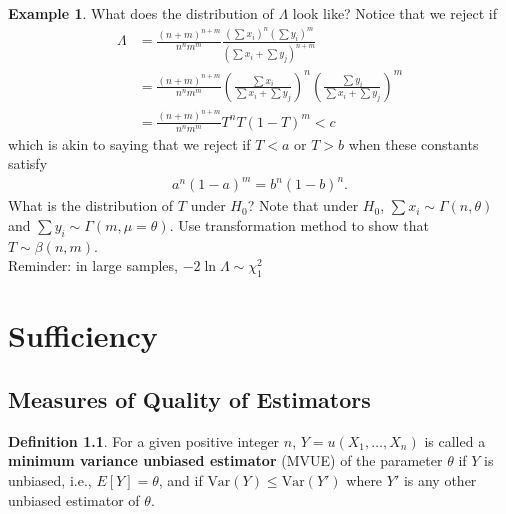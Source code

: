 \documentclass{book}
\theoremstyle{definition}
\newtheorem{defn}{Definition}[section]
\newtheorem{exmp}{Example}[section]
\newcommand{\Var}{\text{Var}}
\newcommand{\f}[2]{\frac{#1}{#2}}
\newcommand{\lp}{\left(}
\newcommand{\rp}{\right)}
\begin{document}
\begin{exmp}
	
	What does the distribution of $\Lambda$ look like? Notice that we reject if
	\begin{align}
	\Lambda &= \f{(n+m)^{n+m}}{n^n m^m} \f{\lp \sum x_i \rp^{n} \lp \sum y_i \rp^{m}}{\lp \sum x_i + \sum y_j \rp^{n+m} }\\
	&= \f{(n+m)^{n+m}}{n^n m^m}\lp \f{ \sum x_i}{ \sum x_i + \sum y_j  }  \rp^n\lp \f{ \sum y_i}{ \sum x_i + \sum y_j  }  \rp^m \\
	&= \f{(n+m)^{n+m}}{n^n m^m} T^n T(1-T)^{m} < c
	\end{align}
	which is akin to saying that we reject if $T < a$ or $T > b$ when these constants satisfy 
	\begin{align}
	a^n (1-a)^m  = b^n (1-b)^n.
	\end{align}
	What is the distribution of $T$ under $H_0$? Note that under $H_0$, $\sum x_i \sim \Gamma(n,\theta)$ and $\sum y_i \sim \Gamma(m, \mu= \theta)$. Use transformation method to show that $T \sim \beta(n,m)$.\\
	
	Reminder: in large samples, $-2\ln \Lambda \sim \chi^2_1$ 
\end{exmp}































\newpage



\chapter{Sufficiency}





\section{Measures of Quality of Estimators}




\begin{defn}
	For a given positive integer $n$, $Y = u(X_1,\dots,X_n)$ is called a \textbf{minimum variance unbiased estimator} (MVUE) of the parameter $\theta$ if $Y$ is unbiased, i.e., $E[Y] = \theta$, and if $\Var(Y) \leq \Var(Y')$ where $Y'$ is any other unbiased estimator of $\theta$. 
\end{defn}
\end{document}
